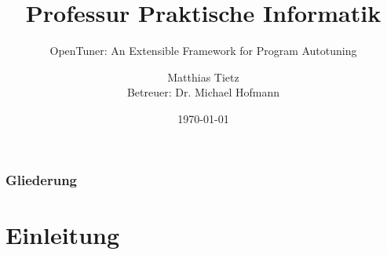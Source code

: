 
\usepackage[utf8]{inputenc}
\usepackage{babel}
\usepackage{floatflt}
\usepackage{float}
\usepackage{graphics}


%
%


\title{Professur Praktische Informatik}
\subtitle{OpenTuner: An Extensible Framework for Program Autotuning}
\author{Matthias Tietz\\Betreuer: Dr. Michael Hofmann}


\date{\today}
\institute[TUC]


    \tucthreeheadlines
    \begin{frame}
      \titlepage
    \end{frame}

    \tucnarrowframe
    \begingroup

    \begin{frame}
      \frametitle{Gliederung}
      \tableofcontents
    \end{frame}

    \endgroup
    \tucwideframe
    \tuctwoheadlines

    

    \section{Einleitung}
    

